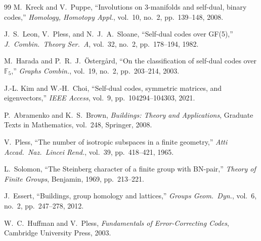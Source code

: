 \documentclass[12pt]{article}
\begin{document}
\begin{thebibliography}{99}
M.~Kreck and V.~Puppe,
``Involutions on 3-manifolds and self-dual, binary codes,''
\textit{Homology, Homotopy Appl.}, vol.~10, no.~2, pp.~139--148, 2008.

J.~S.~Leon, V.~Pless, and N.~J.~A.~Sloane,
``Self-dual codes over GF(5),''
\textit{J.\ Combin.\ Theory Ser.~A}, vol.~32, no.~2, pp.~178--194, 1982.

M.~Harada and P.~R.~J.~\"Osterg\r{a}rd,
``On the classification of self-dual codes over $\mathbb{F}_5$,''
\textit{Graphs Combin.}, vol.~19, no.~2, pp.~203--214, 2003.

J.-L. Kim and W.-H.~Choi,
``Self-dual codes, symmetric matrices, and eigenvectors,''
\textit{IEEE Access}, vol.~9, pp.~104294--104303, 2021.

P.~Abramenko and K.~S.~Brown,
\textit{Buildings: Theory and Applications},
Graduate Texts in Mathematics, vol.~248, Springer, 2008.

V.~Pless,
``The number of isotropic subspaces in a finite geometry,''
\textit{Atti Accad.\ Naz.\ Lincei Rend.}, vol.~39, pp.~418--421, 1965.

L.~Solomon,
``The Steinberg character of a finite group with BN-pair,''
\textit{Theory of Finite Groups}, Benjamin, 1969, pp.~213--221.

J.~Essert,
``Buildings, group homology and lattices,''
\textit{Groups Geom.\ Dyn.}, vol.~6, no.~2, pp.~247--278, 2012.

W.~C.~Huffman and V.~Pless,
\textit{Fundamentals of Error-Correcting Codes},
Cambridge University Press, 2003.

\end{thebibliography}
\end{document}
